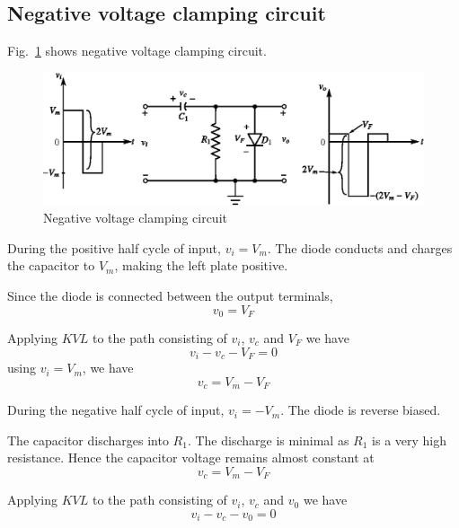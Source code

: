 \eject

\subsection{Negative voltage clamping circuit}\label{sec2.34.1}

Fig.~\ref{fig2.39} shows negative voltage clamping circuit.
\begin{figure}[H]
\centering
\includegraphics{chap2/fig2.39.eps}
\caption{Negative voltage clamping circuit}\label{fig2.39}
\end{figure}

During the positive half cycle of input, $v_{i}=V_{m}$. The diode conducts and charges the capacitor to $V_{m}$, making the left plate positive.

Since the diode is connected between the output terminals,
\begin{equation}
v_{0}=V_{F}\label{eq2.131}
\end{equation}

Applying $KVL$ to the path consisting of $v_{i}$, $v_{c}$ and $V_{F}$ we have
$$
v_{i}-v_{c}-V_{F}=0
$$
using $v_{i}=V_{m}$, we have
\begin{equation}
v_{c}=V_{m}-V_{F}\label{eq2.132}
\end{equation}

During the negative half cycle of input, $v_{i}=-V_{m}$. The diode is reverse biased.

The capacitor discharges into $R_{1}$. The discharge is minimal as $R_{1}$ is a very high resistance. Hence the capacitor voltage remains almost constant at
\begin{equation}
v_{c}=V_{m}-V_{F}\label{eq2.133}
\end{equation}

Applying $KVL$ to the path consisting of $v_{i}$, $v_{c}$ and $v_{0}$ we have
\begin{equation}
v_{i}-v_{c}-v_{0}=0\label{eq2.134}
\end{equation}

